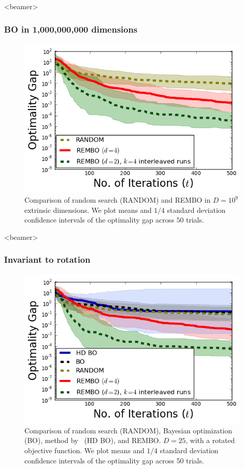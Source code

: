 \documentclass[grey]{beamer}
\begin{document}
 \begin{frame}<beamer>
  \frametitle{BO in 1,000,000,000 dimensions}
  \begin{figure}
   \includegraphics[width=0.6\columnwidth]{../paper/figures/branin_dis_1b.png}
   \caption{Comparison of random search (RANDOM) and REMBO
     in $D=10^9$ extrinsic dimensions. 
     We plot means and $1/4$ standard deviation confidence intervals of the optimality gap across $50$ trials.}
   \label{fig:standard}
  \end{figure}
 \end{frame}
 
 \begin{frame}<beamer>
  \frametitle{Invariant to rotation}
  
  
  \begin{figure}
   \includegraphics[width=0.6\columnwidth]{../paper/figures/branin_dis_rot.png}
   \caption{Comparison of random search (RANDOM), Bayesian optimization (BO),
     method by~\protect\cite{Chen:2012} (HD BO), and REMBO.
     $D=25$, with a rotated objective function. We plot means and $1/4$ standard deviation confidence intervals of the optimality gap across 50 trials.}
   \label{fig:standard}
  \end{figure}
 \end{frame}
\end{document}
